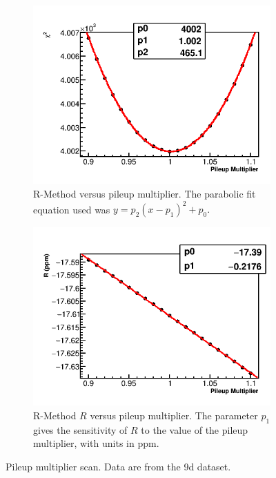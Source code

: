 \begin{figure}
    \begin{subfigure}[t]{0.45\textwidth}
        \centering
        \includegraphics[width=\textwidth]{FullRatio_Chi2_Vs_PileupMultiplier_Canv}
        \caption{R-Method \chisq versus pileup multiplier. The parabolic fit equation used was $y = p_{2}(x - p_{1})^{2} + p_{0}.$}
    \end{subfigure}%
    \hspace{1cm}
    \begin{subfigure}[t]{0.45\textwidth}
        \centering
        \includegraphics[width=\textwidth]{FullRatio_R_Vs_PileupMultiplier_Canv}
        \caption{R-Method $R$ versus pileup multiplier. The parameter $p_{1}$ gives the sensitivity of $R$ to the value of the pileup multiplier, with units in ppm.}
    \end{subfigure}
\caption[Pileup multiplier scan]{Pileup multiplier scan. Data are from the 9d dataset.}
\label{fig:PMscan}
\end{figure}




